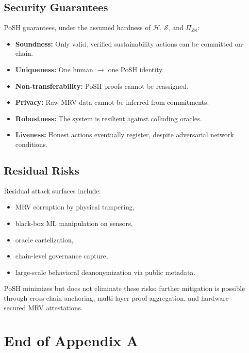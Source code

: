 \documentclass{article}
\begin{document}
\subsection{Security Guarantees}

PoSH guarantees, under the assumed hardness of $\mathcal{H}$, $\mathcal{S}$,
and $\Pi_{\textsf{ZK}}$:

\begin{itemize}
\item \textbf{Soundness:} Only valid, verified sustainability actions can be
committed on-chain.
\item \textbf{Uniqueness:} One human $\rightarrow$ one PoSH identity.
\item \textbf{Non-transferability:} PoSH proofs cannot be reassigned.
\item \textbf{Privacy:} Raw MRV data cannot be inferred from commitments.
\item \textbf{Robustness:} The system is resilient against colluding oracles.
\item \textbf{Liveness:} Honest actions eventually register, despite adversarial
network conditions.
\end{itemize}

\subsection{Residual Risks}

Residual attack surfaces include:

\begin{itemize}
\item MRV corruption by physical tampering,
\item black-box ML manipulation on sensors,
\item oracle cartelization,
\item chain-level governance capture,
\item large-scale behavioral deanonymization via public metadata.
\end{itemize}

PoSH minimizes but does not eliminate these risks; further mitigation is
possible through cross-chain anchoring, multi-layer proof aggregation, and
hardware-secured MRV attestations.

\section{End of Appendix A}

\end{document}
